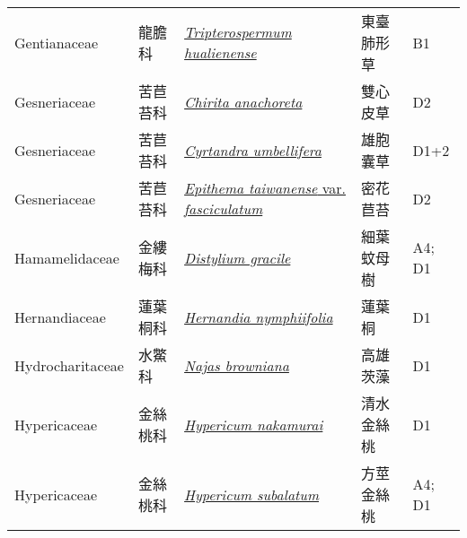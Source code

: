 {\begin{longtable}{L{2.5cm}L{2cm}L{5cm}L{2.5cm}L{3cm}}
    Gentianaceae & 龍膽科 & \href{http://www.theplantlist.org/tpl1.1/search?q=Tripterospermum+hualienense}{\textit{Tripterospermum hualienense} } & 東臺肺形草 & B1    \\
    Gesneriaceae & 苦苣苔科 & \href{http://www.theplantlist.org/tpl1.1/search?q=Chirita+anachoreta}{\textit{Chirita anachoreta} } & 雙心皮草 & D2    \\
    Gesneriaceae & 苦苣苔科 & \href{http://www.theplantlist.org/tpl1.1/search?q=Cyrtandra+umbellifera}{\textit{Cyrtandra umbellifera} } & 雄胞囊草 & D1+2    \\
    Gesneriaceae & 苦苣苔科 & \href{http://www.theplantlist.org/tpl1.1/search?q=Epithema+taiwanense+var.+fasciculatum}{\textit{Epithema taiwanense} var. \textit{fasciculatum} } & 密花苣苔 & D2    \\
    Hamamelidaceae & 金縷梅科 & \href{http://www.theplantlist.org/tpl1.1/search?q=Distylium+gracile}{\textit{Distylium gracile} } & 細葉蚊母樹 & A4; D1    \\
    Hernandiaceae & 蓮葉桐科 & \href{http://www.theplantlist.org/tpl1.1/search?q=Hernandia+nymphiifolia}{\textit{Hernandia nymphiifolia} } & 蓮葉桐 & D1    \\
    Hydrocharitaceae & 水鱉科 & \href{http://www.theplantlist.org/tpl1.1/search?q=Najas+browniana}{\textit{Najas browniana} } & 高雄茨藻 & D1    \\
    Hypericaceae & 金絲桃科 & \href{http://www.theplantlist.org/tpl1.1/search?q=Hypericum+nakamurai}{\textit{Hypericum nakamurai} } & 清水金絲桃 & D1    \\
    Hypericaceae & 金絲桃科 & \href{http://www.theplantlist.org/tpl1.1/search?q=Hypericum+subalatum}{\textit{Hypericum subalatum} } & 方莖金絲桃 & A4; D1    \\

\end{longtable}}
